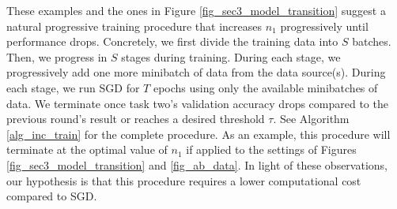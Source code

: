 These examples and the ones in Figure \ref{fig_sec3_model_transition} suggest a natural progressive training procedure that increases $n_1$ progressively until performance drops.
Concretely, we first divide the training data into $S$ batches.
Then, we progress in $S$ stages during training. During each stage, we progressively add one more minibatch of data from the data source(s).
During each stage, we run SGD for $T$ epochs using only the available minibatches of data.
We terminate once task two's validation accuracy drops compared to the previous round's result or reaches a desired threshold $\tau$.
See Algorithm \ref{alg_inc_train} for the complete procedure.
As an example, this procedure will terminate at the optimal value of $n_1$ if applied to the settings of Figures  \ref{fig_sec3_model_transition} and \ref{fig_ab_data}.
In light of these observations, our hypothesis is that this procedure requires a lower computational cost compared to SGD.

